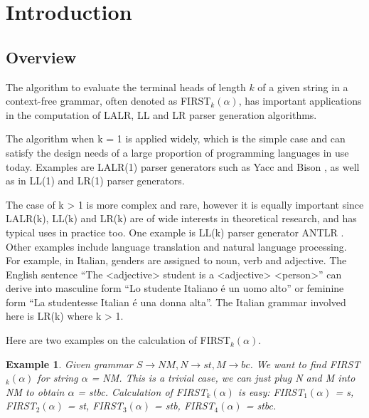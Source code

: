 \documentclass{sig-alternate-05-2015}
\newtheorem{SampleEnv}{Example}[section]
\begin{document}


%
%

%
%
\printccsdesc



\section{Introduction}
\subsection{Overview}
The algorithm to evaluate the terminal heads of length $k$ of
a given string in a context-free grammar, often denoted as
FIRST$_k(\alpha)$, has important applications in the computation
of LALR, LL and LR parser generation algorithms.

The algorithm when k = 1 is applied widely, which is
the simple case and can satisfy the design needs of a large
proportion of programming languages in use today. Examples
are LALR(1) parser generators such as Yacc and Bison
\cite{johnson79yacc,donnelly03bison, gnu:bison}, as well as in LL(1) and LR(1) parser generators.

The case of k > 1 is more complex and rare, however it
is equally important since LALR(k), LL(k) and LR(k) are
of wide interests in theoretical research, and has typical
uses in practice too. One example is LL(k) parser generator
ANTLR \cite{parr93ll,antlr}. Other examples include language translation
and natural language processing. For example, in Italian,
genders are assigned to noun, verb and adjective. The
English sentence “The <adjective> student is a <adjective>
<person>” can derive into masculine form “Lo studente
Italiano é un uomo alto” or feminine form “La studentesse
Italian é una donna alta”. The Italian grammar involved
here is LR(k) where k > 1.

Here are two examples on the calculation of FIRST$_k(\alpha)$.

\begin{SampleEnv}
Given grammar $S\rightarrow NM, N\rightarrow st, M\rightarrow bc$.
We want to find FIRST$_k(\alpha)$ for string $\alpha$ = NM. This is a
trivial case, we can just plug N and M into NM to obtain $\alpha$
= stbc. Calculation of FIRST$_k(\alpha)$ is easy: FIRST$_1(\alpha)$ = {s},
FIRST$_2(\alpha)$ = {st}, FIRST$_3(\alpha)$ = {stb}, FIRST$_4(\alpha)$ = {stbc}.
\end{SampleEnv}
\end{document}

